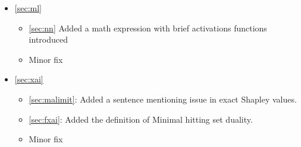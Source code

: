\begin{itemize}
	\item \autoref{sec:ml}
		\begin{itemize}
			\item \autoref{sec:nn} Added a math expression with brief activations
				functions introduced
			\item Minor fix
		\end{itemize}
	\item \autoref{sec:xai}
		\begin{itemize}
			\item \autoref{sec:malimit}: Added a sentence mentioning issue in exact
				Shapley values.
			\item \autoref{sec:fxai}: Added the definition of Minimal hitting set duality.
			\item Minor fix
		\end{itemize}
	
\end{itemize}
\color{black}

